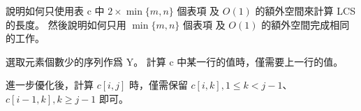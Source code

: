 \startEXERCISE
說明如何只使用表 c 中 $2 \times \min\{m,n\}$ 個表項
及 $O(1)$ 的額外空間來計算 LCS 的長度。
然後說明如何只用 $\min\{m,n\}$ 個表項
及 $O(1)$ 的額外空間完成相同的工作。
\stopEXERCISE

\startANSWER
選取元素個數少的序列作爲 Y。
計算 c 中某一行的值時，僅需要上一行的值。

進一步優化後，計算 $c[i,j]$ 時，僅需保留
$c[i, k], 1\le k < j-1$、
$c[i-1, k], k \ge j-1$ 即可。
\stopANSWER
